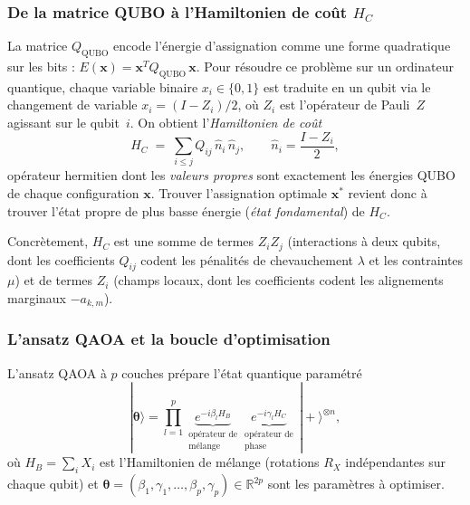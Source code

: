 \documentclass[12pt,a4paper]{article}
\begin{document}
\subsubsection{De la matrice QUBO à l'Hamiltonien de coût $H_C$}

La matrice $Q_{\mathrm{QUBO}}$ encode l'énergie d'assignation comme une forme
quadratique sur les bits : $E(\bm{x}) = \bm{x}^T Q_{\mathrm{QUBO}}\,\bm{x}$.
Pour résoudre ce problème sur un ordinateur quantique, chaque variable binaire
$x_i \in \{0,1\}$ est traduite en un qubit via le changement de variable
$x_i = (I - Z_i)/2$, où $Z_i$ est l'opérateur de Pauli~$Z$ agissant sur le
qubit~$i$.
On obtient l'\emph{Hamiltonien de coût}
\begin{equation}
  H_C \;=\; \sum_{i \leq j} Q_{ij}\,\hat{n}_i\,\hat{n}_j,
  \qquad \hat{n}_i = \frac{I - Z_i}{2},
  \label{eq:hc_detail}
\end{equation}
opérateur hermitien dont les \emph{valeurs propres} sont exactement les énergies
QUBO de chaque configuration $\bm{x}$.
Trouver l'assignation optimale $\bm{x}^*$ revient donc à trouver l'état propre
de plus basse énergie (\emph{état fondamental}) de $H_C$.

Concrètement, $H_C$ est une somme de termes $Z_iZ_j$ (interactions à deux qubits,
dont les coefficients $Q_{ij}$ codent les pénalités de chevauchement $\lambda$ et
les contraintes $\mu$) et de termes $Z_i$ (champs locaux, dont les coefficients
codent les alignements marginaux $-a_{k,m}$).

\subsubsection{L'ansatz QAOA et la boucle d'optimisation}

L'ansatz QAOA à $p$ couches prépare l'état quantique paramétré
\begin{equation}
  |\bm{\theta}\rangle
  = \prod_{l=1}^{p}
    \underbrace{e^{-i\beta_l H_B}}_{\substack{\text{opérateur de} \\ \text{mélange}}}
    \underbrace{e^{-i\gamma_l H_C}}_{\substack{\text{opérateur de} \\ \text{phase}}}
  \,|+\rangle^{\otimes n},
  \label{eq:qaoa_detail}
\end{equation}
où $H_B = \sum_i X_i$ est l'Hamiltonien de mélange (rotations $R_X$ indépendantes
sur chaque qubit) et $\bm{\theta} = (\beta_1, \gamma_1, \ldots, \beta_p, \gamma_p)
\in \mathbb{R}^{2p}$ sont les paramètres à optimiser.
\end{document}
